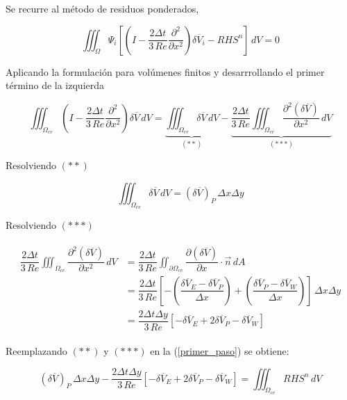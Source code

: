 Se recurre al método de residuos ponderados,

\begin{equation} \label{primer_paso}
\iiint_{\Omega} \Psi_i \left[ \left( I - \dfrac{2 \Delta t}{3 \, Re}  \dfrac{\partial^2}{\partial x^2} \right) \delta \overline{V}_i - RHS^n \right] \, dV = 0
\end{equation}

Aplicando la formulación para volúmenes finitos y desarrrollando el primer término de la izquierda

\begin{equation}
\iiint_{\Omega_{cv}} \left( I - \dfrac{2 \Delta t}{3 \, Re}  \dfrac{\partial^2}{\partial x^2} \right) \delta \overline{V} \, dV =  \underbrace{\iiint_{\Omega_{cv}} \delta \overline{V} \, dV}_{(**)}  - \underbrace{\dfrac{2 \Delta t}{3 \, Re} \iiint_{\Omega_{cv}}  \dfrac{\partial^2 (\delta \overline{V}) }{\partial x^2} \, dV}_{(***)}
\end{equation}

Resolviendo $(**)$

\begin{equation}
\iiint_{\Omega_{cv}} \delta \overline{V} \, dV =  (\delta \overline{V})_P \, \Delta x \Delta y
\end{equation}

Resolviendo $(***)$

\begin{align*}
\begin{split}
\dfrac{2 \Delta t}{3 \, Re} \iiint_{\Omega_{cv}}  \dfrac{\partial^2 (\delta \overline{V}) }{\partial x^2} \, dV &= \dfrac{2 \Delta t}{3 \, Re} \iint_{\partial \Omega_{cv}} \dfrac{\partial (\delta \overline{V})}{\partial x} \cdot \vec{n} \, dA \\
&= \dfrac{2 \Delta t}{3 \, Re} \left[ -\left(\dfrac{\delta \overline{V}_E - \delta \overline{V}_P}{\Delta x} \right) + \left( \dfrac{\delta \overline{V}_P-\delta \overline{V}_W}{\Delta x} \right) \right] \, \Delta x \Delta y \\
&= \dfrac{2 \Delta t \Delta y}{3 \, Re} \left[ -\delta \overline{V}_E + 2 \delta \overline{V}_P - \delta \overline{V}_W \right]
\end{split}
\end{align*}

Reemplazando $(**)$ y $(***)$ en la (\ref{primer_paso}) se obtiene:

\begin{equation}
(\delta \overline{V})_P \, \Delta x \Delta y - \dfrac{2 \Delta t \Delta y}{3 \, Re} \left[ -\delta \overline{V}_E + 2 \delta \overline{V}_P - \delta \overline{V}_W \right] = \iiint_{\Omega_{cv}} RHS^n \, dV
\end{equation}

